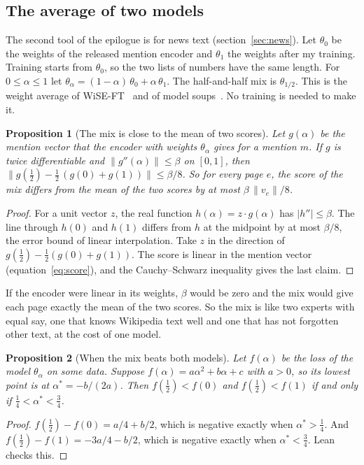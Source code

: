 \documentclass[11pt]{article}
\newtheorem{proposition}{Proposition}
\theoremstyle{definition}
\begin{document}
\subsection{The average of two models}
\label{sec:mixmath}

The second tool of the epilogue is for news text (section~\ref{sec:news}). Let $\theta_0$ be the weights of the released mention encoder and $\theta_1$ the weights after my training. Training starts from $\theta_0$, so the two lists of numbers have the same length. For $0 \le \alpha \le 1$ let $\theta_\alpha = (1 - \alpha)\,\theta_0 + \alpha\,\theta_1$. The half-and-half mix is $\theta_{1/2}$. This is the weight average of WiSE-FT~\cite{wortsman2022wiseft} and of model soups~\cite{wortsman2022soups}. No training is needed to make it.

\begin{proposition}[The mix is close to the mean of two scores]
\label{prop:mixscore}
Let $g(\alpha)$ be the mention vector that the encoder with weights $\theta_\alpha$ gives for a mention $m$. If $g$ is twice differentiable and $\|g''(\alpha)\| \le \beta$ on $[0, 1]$, then $\|g(\tfrac12) - \tfrac12\,(g(0) + g(1))\| \le \beta/8$. So for every page $e$, the score of the mix differs from the mean of the two scores by at most $\beta\,\|v_e\|/8$.
\end{proposition}
\begin{proof}
For a unit vector $z$, the real function $h(\alpha) = z \cdot g(\alpha)$ has $|h''| \le \beta$. The line through $h(0)$ and $h(1)$ differs from $h$ at the midpoint by at most $\beta/8$, the error bound of linear interpolation. Take $z$ in the direction of $g(\tfrac12) - \tfrac12(g(0) + g(1))$. The score is linear in the mention vector (equation~\ref{eq:score}), and the Cauchy--Schwarz inequality gives the last claim.
\end{proof}

If the encoder were linear in its weights, $\beta$ would be zero and the mix would give each page exactly the mean of the two scores. So the mix is like two experts with equal say, one that knows Wikipedia text well and one that has not forgotten other text, at the cost of one model.

\begin{proposition}[When the mix beats both models]
\label{prop:mixbeats}
Let $f(\alpha)$ be the loss of the model $\theta_\alpha$ on some data. Suppose $f(\alpha) = a\alpha^2 + b\alpha + c$ with $a > 0$, so its lowest point is at $\alpha^{*} = -b/(2a)$. Then $f(\tfrac12) < f(0)$ and $f(\tfrac12) < f(1)$ if and only if $\tfrac14 < \alpha^{*} < \tfrac34$.
\end{proposition}
\begin{proof}
$f(\tfrac12) - f(0) = a/4 + b/2$, which is negative exactly when $\alpha^{*} > \tfrac14$. And $f(\tfrac12) - f(1) = -3a/4 - b/2$, which is negative exactly when $\alpha^{*} < \tfrac34$. Lean checks this.
\end{proof}
\end{document}
